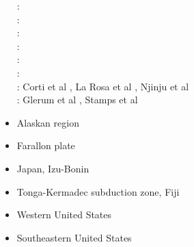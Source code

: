 \begin{itemize}
\begin{scriptsize}
\twothousandseven:
\cite{mitk07}\\
\twothousandeight:
\cite{cort08}\\
\twothousandnine:
\cite{kekj09}\\
\twothousandten:
\cite{beve10}\\
\twothousandfourteen:
\cite{phcs14}\cite{sacs14}\\
\twothousandseventeen:
\cite{brcr17} \cite{brcg17}\\
\twothousandnineteen:
Corti et al \cite{cocf19}, La Rosa et al \cite{lapk19}, Njinju et al \cite{njas19}\\
\twothousandtwenty:
Glerum et al \cite{glbs20},
Stamps et al \cite{stkf20}
\end{scriptsize}

\item{Alaskan region} 
{\scriptsize
\cite{kohp10}
\cite{jabi10a}
\cite{jabi12}
\cite{jabr13}
\cite{haja17}
\cite{mimo18}
}
\item{Farallon plate} 
{\scriptsize
\cite{lisg08}
\cite{list11}
\cite{list12}
\cite{licu16}
}
\item{Japan, Izu-Bonin} 
{\scriptsize
\cite{hond85}
\cite{lohd07}
\cite{vakn12}
\cite{musi13}
\cite{kigk14}\cite{leli14}\cite{mova14}\cite{hond14}
\cite{kilk15}
\cite{yagz17}
\cite{yamg19}
\cite{mapg20}
}
\item{Tonga-Kermadec subduction zone, Fiji} 
{\scriptsize
\cite{bigs03}\cite{bigu03}
\cite{zhpy06}
}
\item{Western United States}
{\scriptsize
\cite{besb06}
}
\item{Southeastern United States}
{\scriptsize
\cite{heps18}
}


\end{itemize}

